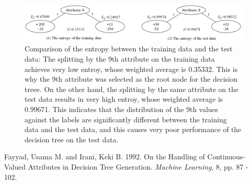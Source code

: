 \begin{enumerate}
\begin{figure}[hbtp]
\centering
\includegraphics[width=150mm]{figure2.png}
\caption{Comparison of the entropy between the training data and the test data: The splitting by the 9th attribute on the training data achieves very low entroy, whose weighted average is 0.35332. This is why the 9th attribute was selected as the root node for the decision treee. On the other hand, the splitting by the same attribute on the test data results in very high entroy, whose weighted average is 0.99671. This indicates that the distribution of the 9th values against the labels are significantly different between the training data and the test data, and this causes very poor performance of the decision tree on the test data.}
\label{fig:comparison}
\end{figure}

\end{enumerate}

\begin{thebibliography}{9}
 Fayyad, Usama M. and Irani, Keki B. 1992. On the Handling of Continuous-Valued Attributes in Decision Tree Generation. {\it Machine Learning}, 8, pp. 87 - 102.
\end{thebibliography}



